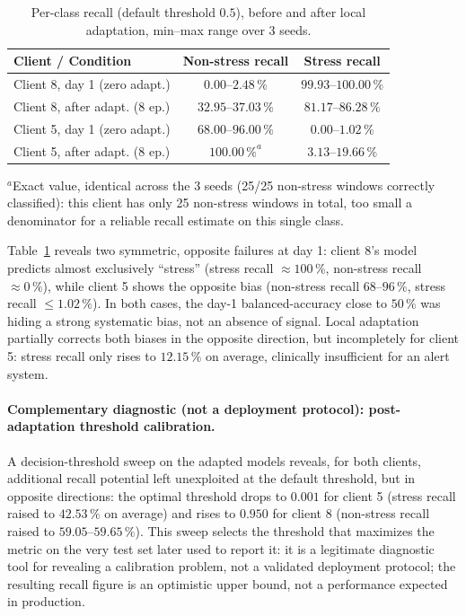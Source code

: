 \documentclass{acmart}
\begin{document}
\begin{table}[h!]
\centering
\small
\caption{Per-class recall (default threshold $0.5$), before and after local
adaptation, min--max range over 3 seeds.}
\label{tab:recall}
\begin{tabular}{lcc}
\toprule
Client / Condition & Non-stress recall & Stress recall \\
\midrule
Client 8, day 1 (zero adapt.)   & $0.00$--$2.48\,\%$   & $99.93$--$100.00\,\%$ \\
Client 8, after adapt. (8 ep.)  & $32.95$--$37.03\,\%$ & $81.17$--$86.28\,\%$ \\
Client 5, day 1 (zero adapt.)   & $68.00$--$96.00\,\%$ & $0.00$--$1.02\,\%$ \\
Client 5, after adapt. (8 ep.)  & $100.00\,\%^{a}$       & $3.13$--$19.66\,\%$ \\
\bottomrule
\end{tabular}

\vspace{2pt}
{\footnotesize $^{a}$Exact value, identical across the 3 seeds (25/25 non-stress
windows correctly classified): this client has only 25 non-stress windows in total,
too small a denominator for a reliable recall estimate on this single class.}
\end{table}

Table~\ref{tab:recall} reveals two symmetric, opposite failures at day 1: client 8's
model predicts almost exclusively ``stress'' (stress recall $\approx100\,\%$,
non-stress recall $\approx0\,\%$), while client 5 shows the opposite bias (non-stress
recall $68$--$96\,\%$, stress recall $\leq1.02\,\%$). In both cases, the day-1
balanced-accuracy close to $50\,\%$ was hiding a strong systematic bias, not an
absence of signal. Local adaptation partially corrects both biases in the opposite
direction, but incompletely for client 5: stress recall only rises to $12.15\,\%$ on
average, clinically insufficient for an alert system.

\paragraph{Complementary diagnostic (not a deployment protocol): post-adaptation
threshold calibration.} A decision-threshold sweep on the adapted models reveals, for
both clients, additional recall potential left unexploited at the default threshold,
but in opposite directions: the optimal threshold drops to $0.001$ for client 5
(stress recall raised to $42.53\,\%$ on average) and rises to $0.950$ for client 8
(non-stress recall raised to $59.05$--$59.65\,\%$). This sweep selects the threshold
that maximizes the metric on the very test set later used to report it: it is a
legitimate diagnostic tool for revealing a calibration problem, not a validated
deployment protocol; the resulting recall figure is an optimistic upper bound, not a
performance expected in production.
\end{document}
